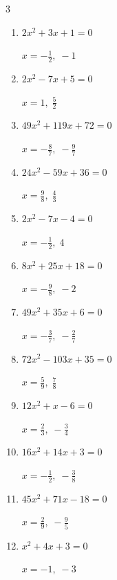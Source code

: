 \begin{multicols}{3}
\begin{enumerate}
        $\displaystyle x=\frac{7}{2},\; -3$

  \item $2x^{2}+3x+1=0$

        $\displaystyle x=-\frac{1}{2},\; -1$

  \item $2x^{2}-7x+5=0$

        $\displaystyle x=1,\; \frac{5}{2}$

\columnbreak %

  \item $49x^{2}+119x+72=0$

        $\displaystyle x=-\frac{8}{7},\; -\frac{9}{7}$

  \item $24x^{2}-59x+36=0$

        $\displaystyle x=\frac{9}{8},\; \frac{4}{3}$

  \item $2x^{2}-7x-4=0$

        $\displaystyle x=-\frac{1}{2},\; 4$

  \item $8x^{2}+25x+18=0$

        $\displaystyle x=-\frac{9}{8},\; -2$

  \item $49x^{2}+35x+6=0$

        $\displaystyle x=-\frac{3}{7},\; -\frac{2}{7}$

  \item $72x^{2}-103x+35=0$

        $\displaystyle x=\frac{5}{9},\; \frac{7}{8}$

  \item $12x^{2}+x-6=0$

        $\displaystyle x=\frac{2}{3},\; -\frac{3}{4}$

  \item $16x^{2}+14x+3=0$

        $\displaystyle x=-\frac{1}{2},\; -\frac{3}{8}$

  \item $45x^{2}+71x-18=0$

        $\displaystyle x=\frac{2}{9},\; -\frac{9}{5}$

  \item $x^{2}+4x+3=0$

        $\displaystyle x=-1,\; -3$

\columnbreak %

\resetques


\end{enumerate}
\end{multicols}
